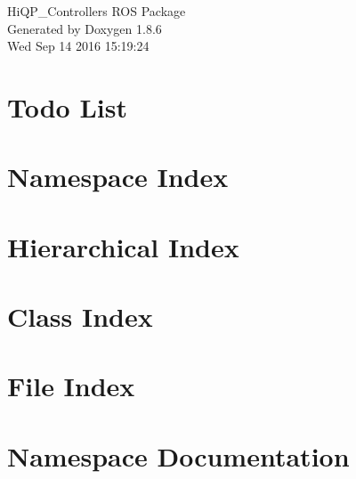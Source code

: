 \documentclass[twoside]{book}
\newcommand{\clearemptydoublepage}{%
  \newpage{\pagestyle{empty}\cleardoublepage}%
}
\begin{document}
\hypersetup{pageanchor=false}
\begin{titlepage}
\vspace*{7cm}
\begin{center}%
{\Large Hi\-Q\-P\-\_\-\-Controllers R\-O\-S Package }\\
\vspace*{1cm}
{\large Generated by Doxygen 1.8.6}\\
\vspace*{0.5cm}
{\small Wed Sep 14 2016 15:19:24}\\
\end{center}
\end{titlepage}
\clearemptydoublepage
\tableofcontents
\clearemptydoublepage
{}
\hypersetup{pageanchor=true}

\chapter{Todo List}
\label{todo}
\hypertarget{todo}{}

\chapter{Namespace Index}

\chapter{Hierarchical Index}

\chapter{Class Index}

\chapter{File Index}

\chapter{Namespace Documentation}

\end{document}
